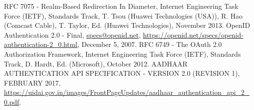 \begin{multicols}{2}
\begin{thebibliography}{99}
 RFC 7075 - Realm-Based Redirection In Diameter, Internet Engineering Task Force (IETF), Standards Track, T. Tsou (Huawei Technologies (USA)), R. Hao (Comcast Cable), T. Taylor, Ed. (Huawei Technologies), November 2013.
 OpenID Authentication 2.0 - Final, \url{specs@openid.net}, \url{https://openid.net/specs/openid-authentication-2_0.html}, December 5, 2007.
 RFC 6749 - The OAuth 2.0 Authorization Framework, Internet Engineering Task Force (IETF), Standards Track, D. Hardt, Ed. (Microsoft), October 2012.
 AADHAAR AUTHENTICATION API SPECIFICATION - VERSION 2.0 (REVISION 1), FEBRUARY 2017, \url{https://uidai.gov.in/images/FrontPageUpdates/aadhaar_authentication_api_2_0.pdf}.
\end{thebibliography}
\end{multicols}
